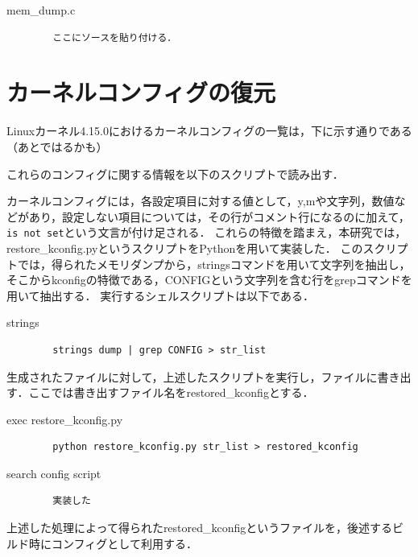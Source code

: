 \begin{itembox}[l]{mem_dump.c}
    \begin{verbatim}
        ここにソースを貼り付ける．
    \end{verbatim}
\end{itembox}

\section{カーネルコンフィグの復元}
\label{section:restore_kconfig}

Linuxカーネル4.15.0におけるカーネルコンフィグの一覧は，下に示す通りである（あとではるかも）

これらのコンフィグに関する情報を以下のスクリプトで読み出す．

カーネルコンフィグには，各設定項目に対する値として，y,mや文字列，数値などがあり，設定しない項目については，その行がコメント行になるのに加えて，\verb|is not set|という文言が付け足される．
これらの特徴を踏まえ，本研究では，restore_kconfig.pyというスクリプトをPythonを用いて実装した．
このスクリプトでは，得られたメモリダンプから，stringsコマンドを用いて文字列を抽出し，そこからkconfigの特徴である，CONFIGという文字列を含む行をgrepコマンドを用いて抽出する．
実行するシェルスクリプトは以下である．

\begin{itembox}[l]{strings}
    \begin{verbatim}
        strings dump | grep CONFIG > str_list
    \end{verbatim}
\end{itembox}

生成されたファイルに対して，上述したスクリプトを実行し，ファイルに書き出す．ここでは書き出すファイル名をrestored_kconfigとする．

\begin{itembox}[l]{exec restore_kconfig.py}
    \begin{verbatim}
        python restore_kconfig.py str_list > restored_kconfig
    \end{verbatim}
\end{itembox}

\begin{itembox}[l]{search config script}
    \begin{verbatim}
        実装した
    \end{verbatim}
\end{itembox}

上述した処理によって得られたrestored_kconfigというファイルを，後述するビルド時にコンフィグとして利用する．

